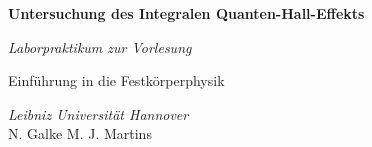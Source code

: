 
\vspace*{0.5cm}

\begin{center}
\huge
\textbf{Untersuchung des Integralen Quanten-Hall-Effekts}

\vspace{1.3cm}

\Large
\textit{Laborpraktikum zur Vorlesung}

\vspace{0.2cm}

Einführung in die Festkörperphysik


\vspace{2.5cm}

\Large
\textit{Leibniz Universität Hannover}\\
\vspace{0.5cm}
N. Galke \hspace{1cm} M. J. Martins

\end{center}

\normalsize

\vspace{1.8cm}


\clearpage

\doublespacing
\tableofcontents

\clearpage

\setcounter{page}{1}

\singlespacing
